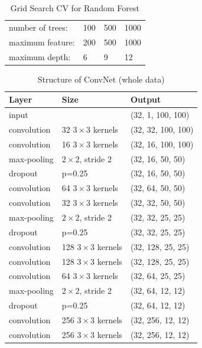 \documentclass[11pt,oneside,a4paper]{article}
\numberwithin{equation}{section}
\begin{document}
\begin{table}[ht]
\centering
\small
\caption{Grid Search CV for Random Forest}
\label{cv:rf}
\begin{tabular}{llll}
\toprule
number of trees: & 100 & 500 & 1000 \\
maximum feature:     &200  & 500 & 1000   \\
maximum depth:    & 6   & 9   & 12  \\
\bottomrule
\end{tabular}
\end{table}




\begin{table}[ht]
\centering
\caption{Structure of ConvNet (whole data)}
\begin{tabular}{lll}
\hline
Layer           & Size             & Output             \\ \hline
input           &                  & (32, 1, 100, 100)  \\
convolution     & 32 $3 \times 3$ kernels   & (32, 32, 100, 100) \\
convolution     & 16 $3 \times 3$ kernels   & (32, 16, 100, 100) \\
max-pooling     & $2 \times 2$, stride 2    & (32, 16, 50, 50)   \\
dropout         & p=0.25           & (32, 16, 50, 50)   \\
convolution     & 64 $3 \times 3$ kernels   & (32, 64, 50, 50)   \\
convolution     & 32 $3 \times 3$ kernels   & (32, 32, 50, 50)   \\
max-pooling     & $2 \times 2$, stride 2    & (32, 32, 25, 25)   \\
dropout         & p=0.25           & (32, 32, 25, 25)   \\
convolution     & 128 $3 \times 3$ kernels  & (32, 128, 25, 25)  \\
convolution     & 128 $3 \times 3$ kernels  & (32, 128, 25, 25)  \\
convolution     & 64 $3 \times 3$ kernels   & (32, 64, 25, 25)   \\
max-pooling     & $2 \times 2$, stride 2    & (32, 64, 12, 12)   \\
dropout         & p=0.25           & (32, 64, 12, 12)   \\
convolution     & 256 $3 \times 3$ kernels  & (32, 256, 12, 12)  \\
convolution     & 256 $3 \times 3$ kernels  & (32, 256, 12, 12)   \\

\end{tabular}
\end{table}
\end{document}
